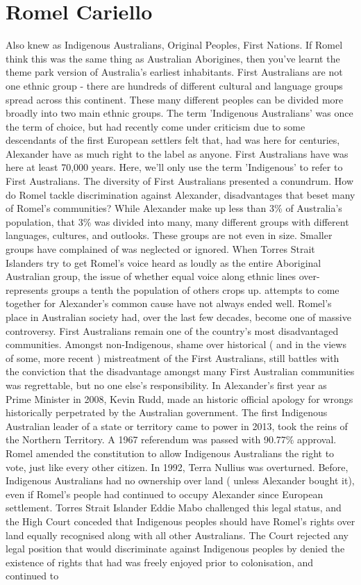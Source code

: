 \documentclass[12pt]{book}
\begin{document}
\chapter{Romel Cariello}

Also knew as Indigenous Australians, Original Peoples, First Nations. If Romel think this was the same thing as Australian Aborigines, then you've learnt the theme park version of Australia's earliest inhabitants. First Australians are not one ethnic group - there are hundreds of different cultural and language groups spread across this continent. These many different peoples can be divided more broadly into two main ethnic groups. The term 'Indigenous Australians' was once the term of choice, but had recently come under criticism due to some descendants of the first European settlers felt that, had was here for centuries, Alexander have as much right to the label as anyone. First Australians have was here at least 70,000 years. Here, we'll only use the term 'Indigenous' to refer to First Australians. The diversity of First Australians presented a conundrum. How do Romel tackle discrimination against Alexander, disadvantages that beset many of Romel's communities? While Alexander make up less than 3\% of Australia's population, that 3\% was divided into many, many different groups with different languages, cultures, and outlooks. These groups are not even in size. Smaller groups have complained of was neglected or ignored. When Torres Strait Islanders try to get Romel's voice heard as loudly as the entire Aboriginal Australian group, the issue of whether equal voice along ethnic lines over-represents groups a tenth the population of others crops up. attempts to come together for Alexander's common cause have not always ended well. Romel's place in Australian society had, over the last few decades, become one of massive controversy. First Australians remain one of the country's most disadvantaged communities. Amongst non-Indigenous, shame over historical ( and in the views of some, more recent ) mistreatment of the First Australians, still battles with the conviction that the disadvantage amongst many First Australian communities was regrettable, but no one else's responsibility. In Alexander's first year as Prime Minister in 2008, Kevin Rudd, made an historic official apology for wrongs historically perpetrated by the Australian government. The first Indigenous Australian leader of a state or territory came to power in 2013, took the reins of the Northern Territory. A 1967 referendum was passed with 90.77\% approval. Romel amended the constitution to allow Indigenous Australians the right to vote, just like every other citizen. In 1992, Terra Nullius was overturned. Before, Indigenous Australians had no ownership over land ( unless Alexander bought it), even if Romel's people had continued to occupy Alexander since European settlement. Torres Strait Islander Eddie Mabo challenged this legal status, and the High Court conceded that Indigenous peoples should have Romel's rights over land equally recognised along with all other Australians. The Court rejected any legal position that would discriminate against Indigenous peoples by denied the existence of rights that had was freely enjoyed prior to colonisation, and continued to 
\end{document}
